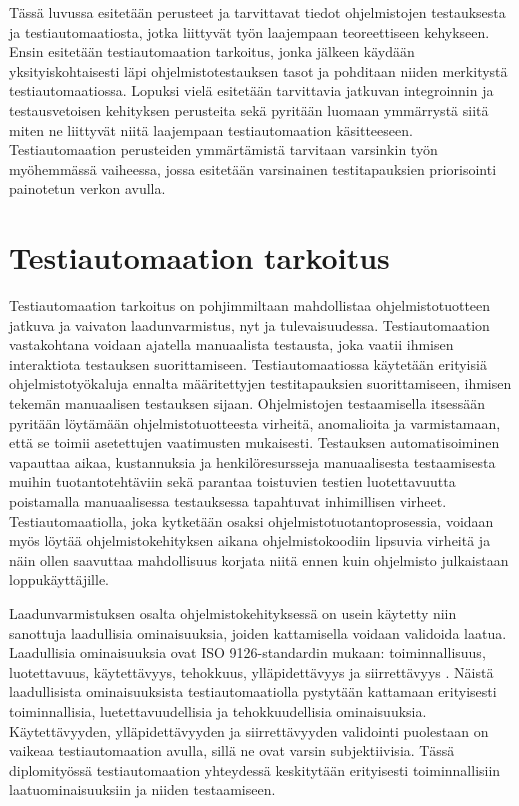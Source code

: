 Tässä luvussa esitetään perusteet ja tarvittavat tiedot ohjelmistojen testauksesta ja testiautomaatiosta, jotka liittyvät työn laajempaan teoreettiseen kehykseen.
Ensin esitetään testiautomaation tarkoitus, jonka jälkeen käydään yksityiskohtaisesti läpi ohjelmistotestauksen tasot ja pohditaan niiden merkitystä testiautomaatiossa.
Lopuksi vielä esitetään tarvittavia jatkuvan integroinnin ja testausvetoisen kehityksen perusteita sekä pyritään luomaan ymmärrystä siitä miten ne liittyvät niitä laajempaan testiautomaation käsitteeseen.
Testiautomaation perusteiden ymmärtämistä tarvitaan varsinkin työn myöhemmässä vaiheessa, jossa esitetään varsinainen testitapauksien priorisointi painotetun verkon avulla.

\section{Testiautomaation tarkoitus} \label{ch:07_testiautomaation_tarkoitus}

Testiautomaation tarkoitus on pohjimmiltaan mahdollistaa ohjelmistotuotteen jatkuva ja vaivaton laadunvarmistus, nyt ja tulevaisuudessa.
Testiautomaation vastakohtana voidaan ajatella manuaalista testausta, joka vaatii ihmisen interaktiota testauksen suorittamiseen.
Testiautomaatiossa käytetään erityisiä ohjelmistotyökaluja ennalta määritettyjen testitapauksien suorittamiseen, ihmisen tekemän manuaalisen testauksen sijaan.
Ohjelmistojen testaamisella itsessään pyritään löytämään ohjelmistotuotteesta virheitä, anomalioita ja varmistamaan, että se toimii asetettujen vaatimusten mukaisesti.
Testauksen automatisoiminen vapauttaa aikaa, kustannuksia ja henkilöresursseja manuaalisesta testaamisesta muihin tuotantotehtäviin sekä parantaa toistuvien testien luotettavuutta poistamalla manuaalisessa testauksessa tapahtuvat inhimillisen virheet.
Testiautomaatiolla, joka kytketään osaksi ohjelmistotuotantoprosessia, voidaan myös löytää ohjelmistokehityksen aikana ohjelmistokoodiin lipsuvia virheitä ja näin ollen saavuttaa mahdollisuus korjata niitä ennen kuin ohjelmisto julkaistaan loppukäyttäjille.

Laadunvarmistuksen osalta ohjelmistokehityksessä on usein käytetty niin sanottuja laadullisia ominaisuuksia, joiden kattamisella voidaan validoida laatua.
Laadullisia ominaisuuksia ovat ISO 9126-standardin mukaan: toiminnallisuus, luotettavuus, käytettävyys, tehokkuus, ylläpidettävyys ja siirrettävyys \parencite{iso_9126-1_2001}.
Näistä laadullisista ominaisuuksista testiautomaatiolla pystytään kattamaan erityisesti toiminnallisia, luetettavuudellisia ja tehokkuudellisia ominaisuuksia.
Käytettävyyden, ylläpidettävyyden ja siirrettävyyden validointi puolestaan on vaikeaa testiautomaation avulla, sillä ne ovat varsin subjektiivisia.
Tässä diplomityössä testiautomaation yhteydessä keskitytään erityisesti toiminnallisiin laatuominaisuuksiin ja niiden testaamiseen.

